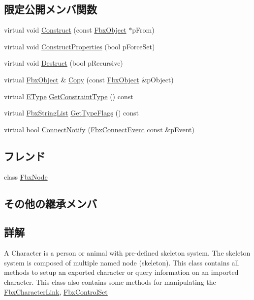 \subsection*{限定公開メンバ関数}
\begin{DoxyCompactItemize}
\item 
virtual void \hyperlink{class_fbx_character_afccb9b74c28560f04f05581a55c0b58a}{Construct} (const \hyperlink{class_fbx_object}{Fbx\+Object} $\ast$p\+From)
\item 
virtual void \hyperlink{class_fbx_character_ae66db4ff3c527db3c47064c700ce179a}{Construct\+Properties} (bool p\+Force\+Set)
\item 
virtual void \hyperlink{class_fbx_character_a6a5bb02a06df228598ebfc4158c30b29}{Destruct} (bool p\+Recursive)
\item 
virtual \hyperlink{class_fbx_object}{Fbx\+Object} \& \hyperlink{class_fbx_character_a54ea68d64fe0dc2e052e2b5e475fa170}{Copy} (const \hyperlink{class_fbx_object}{Fbx\+Object} \&p\+Object)
\item 
virtual \hyperlink{class_fbx_constraint_a49c1634663395eab7c28856df233ec66}{E\+Type} \hyperlink{class_fbx_character_ab6c9f1540880fa72c17a27d19ff11425}{Get\+Constraint\+Type} () const
\item 
virtual \hyperlink{class_fbx_string_list}{Fbx\+String\+List} \hyperlink{class_fbx_character_ab0b957ac50d562eb146fff27e0f6b937}{Get\+Type\+Flags} () const
\item 
virtual bool \hyperlink{class_fbx_character_a42e5f6d72c0669b6eedf0cb511720845}{Connect\+Notify} (\hyperlink{class_fbx_connect_event}{Fbx\+Connect\+Event} const \&p\+Event)
\end{DoxyCompactItemize}
\subsection*{フレンド}
\begin{DoxyCompactItemize}
\item 
class \hyperlink{class_fbx_character_a7b27a89b3d5b45cd1a28960c77e4880b}{Fbx\+Node}
\end{DoxyCompactItemize}
\subsection*{その他の継承メンバ}


\subsection{詳解}
A Character is a person or animal with pre-\/defined skeleton system. The skeleton system is composed of multiple named node (skeleton). This class contains all methods to setup an exported character or query information on an imported character. This class also contains some methods for manipulating the \hyperlink{class_fbx_character_link}{Fbx\+Character\+Link}, \hyperlink{class_fbx_control_set}{Fbx\+Control\+Set}

